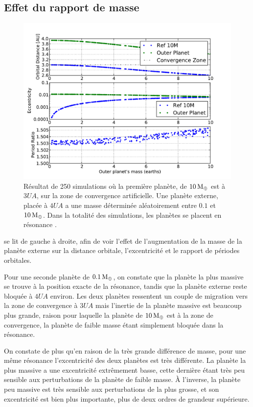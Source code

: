 \subsection{Effet du rapport de masse}
\begin{figure}[htbp]
\centering
\includegraphics[width=0.75\linewidth]{figure/MMR_mass_ratio.pdf}
\caption{Résultat de 250 simulations où la première planète, de $10\mathrm{\thinspace M_\oplus}$ est à $3\unit{UA}$, sur
la zone de convergence artificielle. Une planète externe, placée à $4\unit{UA}$ a une masse
déterminée aléatoirement entre $0.1$ et $10\mathrm{\thinspace M_\oplus}$. Dans la totalité des simulations, les planètes
se placent en résonance .}\label{fig:MMR_mass_ratio}
\end{figure}

 se lit de gauche à droite, afin de voir l'effet de l'augmentation de la masse de la planète externe
sur la distance orbitale, l'excentricité et le rapport de périodes orbitales. 

Pour une seconde planète de $0.1\mathrm{\thinspace M_\oplus}$, on constate que la planète la plus massive se trouve à la position exacte de la
résonance, tandis que la planète externe reste bloquée à $4\unit{UA}$ environ. Les deux planètes ressentent un couple de
migration vers la zone de convergence à $3\unit{UA}$ mais l'inertie de la planète massive est beaucoup plus grande, raison pour
laquelle la planète de $10\mathrm{\thinspace M_\oplus}$ est à la zone de convergence, la planète de faible masse étant simplement bloquée dans la
résonance. 

On constate de plus qu'en raison de la très grande différence de masse, pour une même résonance l'excentricité des deux
planètes est très différente. La planète la plus massive a une excentricité extrêmement basse, cette dernière étant très peu
sensible aux perturbations de la planète de faible masse. À l'inverse, la planète peu massive est très sensible aux
perturbations de la plus grosse, et son excentricité est bien plus importante, plus de deux ordres de grandeur supérieure.

